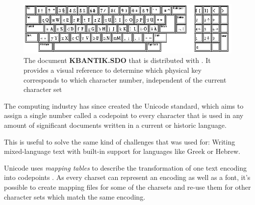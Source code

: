 \begin{figure}[h]
    \centering
    \includegraphics[width=\columnwidth]{img/ANTIKRO.png}
    \caption{The document \textbf{KBANTIK.SDO} that is distributed with \Signum{}. It provides a visual reference to determine which physical key corresponds to which character number, independent of the current character set}
    \label{fig:my_label}
\end{figure}

The computing industry has since created the \gls{Unicode} standard, which aims to assign a single number called a \gls{codepoint} to every character that is used in any amount of significant documents written in a current or historic language.

This is useful to solve the same kind of challenges that \Signum{} was used for: Writing mixed-language text with built-in support for languages like Greek or Hebrew.

\gls{Unicode} uses \textit{mapping tables} to describe the transformation of one text encoding into \glspl{codepoint} \cite{unicode2015atarist}. As every \Signum{} charset can represent an encoding as well as a font, it's possible to create mapping files for some of the charsets \cite{xipho2020antikro} and re-use them for other character sets which match the same encoding.
